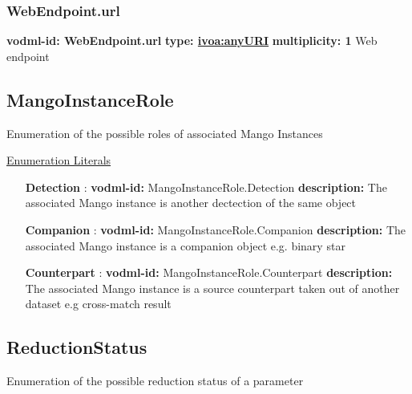     \subsubsection{WebEndpoint.url}
      \textbf{vodml-id: WebEndpoint.url} \newline
      \textbf{type: \hyperref[sect:ivoa]{ivoa:anyURI}} \newline
      \textbf{multiplicity: 1} \newline 
      Web endpoint

  \subsection{MangoInstanceRole}
  \label{sect:MangoInstanceRole}

  Enumeration of the possible roles of associated Mango Instances

  \noindent \underline{Enumeration Literals}
  \vspace{-\parsep}
  \small
  \begin{itemize}
  
    \item[\textbf{Detection}]: \textbf{vodml-id:} MangoInstanceRole.Detection \newline
          \textbf{description:} The associated Mango instance is another dectection of the same object
    \item[\textbf{Companion}]: \textbf{vodml-id:} MangoInstanceRole.Companion \newline
          \textbf{description:} The associated Mango instance is a companion object e.g. binary star
    \item[\textbf{Counterpart}]: \textbf{vodml-id:} MangoInstanceRole.Counterpart \newline
          \textbf{description:} The associated Mango instance is a source counterpart taken out of another dataset e.g cross-match result
  \end{itemize}
  \normalsize


  \subsection{ReductionStatus}
  \label{sect:ReductionStatus}

  Enumeration of the possible reduction status of a parameter

